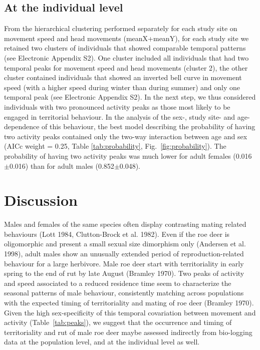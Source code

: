 \documentclass[a4paper,11pt]{article}
\begin{document}
\subsection*{At the individual level}
From the hierarchical clustering performed separately for each study
site on movement speed and head movements (meanX+meanY), for each
study site we retained two clusters of individuals that showed
comparable temporal patterns (see Electronic Appendix S2). One cluster
included all individuals that had two temporal peaks for movement
speed and head movements (cluster 2), the other cluster contained
individuals that showed an inverted bell curve in movement speed (with
a higher speed during winter than during summer) and only one temporal
peak (see Electronic Appendix S2). In the next step, we thus
considered individuals with two pronounced activity peaks as those
most likely to be engaged in territorial behaviour. In the analysis of
the sex-, study site- and age- dependence of this behaviour, the best
model describing the probability of having two activity peaks
contained only the two-way interaction between age and sex (AICc
weight = 0.25, Table \ref{tab:probability},
Fig.~\ref{fig:probability}). The probability of having two activity
peaks was much lower for adult females (0.016$\pm$0.016) than for
adult males (0.852$\pm$0.048).

\section*{Discussion}

Males and females of the same species often display contrasting mating
related behaviours (Lott 1984, Clutton-Brock et al. 1982). Even if the
roe deer is oligomorphic and present a small sexual size dimorphism
only (Andersen et al. 1998), adult males show an unusually extended period of
reproduction-related behaviour for a large herbivore. Male roe deer
start with territoriality in early spring to the end of rut by late
August (Bramley 1970). Two peaks of activity and speed associated to a reduced residence time seem to characterize the seasonal patterns of male behaviour, consistently matching across populations with the expected timing of territoriality and mating of roe deer (Bramley 1970). Given
the high sex-specificity of this temporal covariation between movement
and activity (Table~\ref{tab:peaks}), we suggest that the occurrence
and timing of territoriality and rut of male roe deer maybe assessed indirectly from bio-logging data at the population level, and at the individual level as well.
\end{document}
